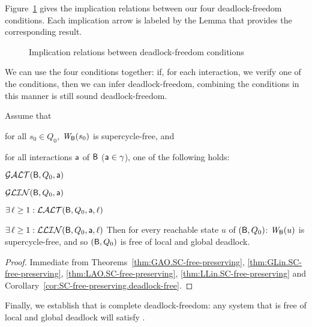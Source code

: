 

Figure~\ref{fig:implications} gives the implication relations between our four deadlock-freedom conditions.
Each implication arrow is labeled by the Lemma that provides the corresponding result.
\begin{figure}[ht]
\begin{center}
\scalebox{0.8}{}
\caption{Implication relations between deadlock-freedom conditions}
\label{fig:implications}
\end{center}
\end{figure}


We can use the four conditions together: if, for each interaction, we verify one of the conditions, then we can infer deadlock-freedom, \ie combining the conditions in this manner is still sound \wrt deadlock-freedom.

\begin{theorem}
\label{theorem:local.deadlock-free}
\label{thm:local.deadlock-free}
Assume that
\bn
\item \label{theorem:local.deadlock-free.initial}
      for all $s_0 \in Q_0$, $\mathit{W}_{\mathsf{B}}({s_0})$ is supercycle-free, and
\item \label{theorem:local.deadlock-free.scfPres}
      for all interactions $\mathsf{a}$ of $\mathsf{B}$ (\ie $\mathsf{a} \in \gamma$), one of
      the following holds:
      \bn
      \item $\mathcal{GALT}(\mathsf{B},Q_0,\mathsf{a})$
      \item $\mathcal{GLIN}(\mathsf{B},Q_0,\mathsf{a})$
      \item $\exists\, \ell \ge 1: \mathcal{LALT}(\mathsf{B},Q_0,\mathsf{a},\ell)$ 
      \item $\exists\, \ell \ge 1: \mathcal{LLIN}(\mathsf{B},Q_0,\mathsf{a},\ell)$ 
      \en
\en
Then for every reachable state $u$ of $(\mathsf{B}, Q_0)$:  $\mathit{W}_{\mathsf{B}}({u})$ is supercycle-free, and so 
$(\mathsf{B}, Q_0)$ is free of local and global deadlock.
\end{theorem}
%
\begin{proof}
Immediate from
Theorems~\ref{thm:GAO.SC-free-preserving}, \ref{thm:GLin.SC-free-preserving}, \ref{thm:LAO.SC-free-preserving}, \ref{thm:LLin.SC-free-preserving}
and Corollary~\ref{cor:SC-free-preserving.deadlock-free}.
\end{proof}




Finally, we establish that \GAO is complete \wrt deadlock-freedom: any system that is free of local and global deadlock will satisfy \GAO.

